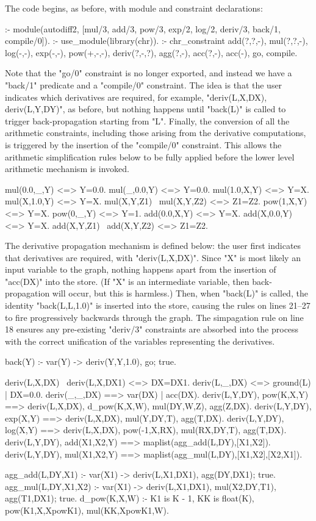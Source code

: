 The code begins, as before, with module and constraint declarations:
\begin{prolog-framed}[name=adtwo]
	:- module(autodiff2, [mul/3, add/3, pow/3, exp/2, log/2, deriv/3, 
	                     back/1, compile/0]).
	:- use_module(library(chr)).
	:- chr_constraint add(?,?,-), mul(?,?,-), log(-,-), exp(-,-), pow(+,-,-),
										deriv(?,-,?), agg(?,-), acc(?,-), acc(-), go, compile.
\end{prolog-framed}
Note that the "go/0" constraint is no longer exported, and instead we have a "back/1"
predicate and a "compile/0" constraint. The idea is that the user indicates 
which derivatives are
required, for example, "deriv(L,X,DX), deriv(L,Y,DY)", as before,
but nothing happens until "back(L)" is called 
to trigger back-propagation starting from "L". Finally, the conversion of 
all the arithmetic constraints,
including those arising from the derivative computations, is triggered by the
insertion of the "compile/0" constraint. This allows the arithmetic simplification rules below to
be fully applied before the lower level arithmetic mechanism is invoked.
\begin{prolog-framed}[name=adtwo,firstnumber=6]
	mul(0.0,_,Y) <=> Y=0.0.
	mul(_,0.0,Y) <=> Y=0.0.
	mul(1.0,X,Y) <=> Y=X.
	mul(X,1.0,Y) <=> Y=X.
	mul(X,Y,Z1) \ mul(X,Y,Z2) <=> Z1=Z2.
	pow(1,X,Y) <=> Y=X.
	pow(0,_,Y) <=> Y=1.
	add(0.0,X,Y) <=> Y=X.
	add(X,0.0,Y) <=> Y=X.
	add(X,Y,Z1) \ add(X,Y,Z2) <=> Z1=Z2.
\end{prolog-framed}
The derivative propagation mechanism is defined below: the user first
indicates that derivatives are required, \eg with "deriv(L,X,DX)".
Since "X" is most likely an input variable to the graph, nothing happens
apart from the insertion of "acc(DX)" into the store.
(If "X" is an intermediate variable,
then back-propagation will occur, but this is harmless.) Then, when
"back(L)" is called, the identity "back(L,L,1.0)" is inserted into the store, 
causing the rules on lines 21--27 to fire progressively backwards through
the graph. The simpagation rule on line 18 ensures any pre-existing "deriv/3"
constraints are absorbed into the process
with the correct unification of the variables representing the derivatives.
\begin{prolog-framed}[name=adtwo,firstnumber=16]
	back(Y) :- var(Y) -> deriv(Y,Y,1.0), go; true.

	deriv(L,X,DX) \ deriv(L,X,DX1) <=> DX=DX1.
	deriv(L,_,DX) <=> ground(L) | DX=0.0.
	deriv(_,_,DX) ==> var(DX) | acc(DX).
	deriv(L,Y,DY), pow(K,X,Y)   ==> deriv(L,X,DX), d_pow(K,X,W), 
	                               mul(DY,W,Z), agg(Z,DX).
	deriv(L,Y,DY), exp(X,Y)     ==> deriv(L,X,DX), mul(Y,DY,T), agg(T,DX).
	deriv(L,Y,DY), log(X,Y)     ==> deriv(L,X,DX), pow(-1,X,RX), 
	                               mul(RX,DY,T), agg(T,DX).
	deriv(L,Y,DY), add(X1,X2,Y) ==> maplist(agg_add(L,DY),[X1,X2]).
	deriv(L,Y,DY), mul(X1,X2,Y) ==> maplist(agg_mul(L,DY),[X1,X2],[X2,X1]).

	agg_add(L,DY,X1)    :- 
		var(X1) -> deriv(L,X1,DX1), agg(DY,DX1); true.
	agg_mul(L,DY,X1,X2) :- 
		var(X1) -> deriv(L,X1,DX1), mul(X2,DY,T1), agg(T1,DX1); true.
	d_pow(K,X,W)   :- 
		K1 is K - 1, KK is float(K), 
		pow(K1,X,XpowK1), mul(KK,XpowK1,W).
\end{prolog-framed}
